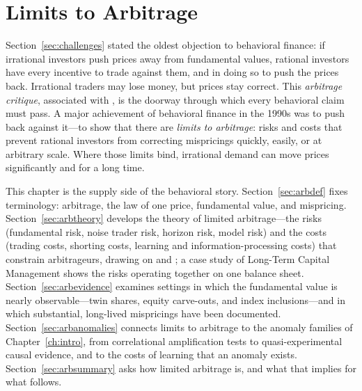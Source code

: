 \chapter{Limits to Arbitrage}
\label{ch:limits}

Section~\ref{sec:challenges} stated the oldest objection to behavioral finance: if irrational investors push prices away from fundamental values, rational investors have every incentive to trade against them, and in doing so to push the prices back. Irrational traders may lose money, but prices stay correct. This \emph{arbitrage critique}, associated with \citet{friedman1953}, is the doorway through which every behavioral claim must pass. A major achievement of behavioral finance in the 1990s was to push back against it---to show that there are \emph{limits to arbitrage}: risks and costs that prevent rational investors from correcting mispricings quickly, easily, or at arbitrary scale. Where those limits bind, irrational demand can move prices significantly and for a long time.

This chapter is the supply side of the behavioral story. Section~\ref{sec:arbdef} fixes terminology: arbitrage, the law of one price, fundamental value, and mispricing. Section~\ref{sec:arbtheory} develops the theory of limited arbitrage---the risks (fundamental risk, noise trader risk, horizon risk, model risk) and the costs (trading costs, shorting costs, learning and information-processing costs) that constrain arbitrageurs, drawing on \citet{delong1990} and \citet{shleifer1997}; a case study of Long-Term Capital Management shows the risks operating together on one balance sheet. Section~\ref{sec:arbevidence} examines settings in which the fundamental value is nearly observable---twin shares, equity carve-outs, and index inclusions---and in which substantial, long-lived mispricings have been documented. Section~\ref{sec:arbanomalies} connects limits to arbitrage to the anomaly families of Chapter~\ref{ch:intro}, from correlational amplification tests to quasi-experimental causal evidence, and to the costs of learning that an anomaly exists. Section~\ref{sec:arbsummary} asks how limited arbitrage is, and what that implies for what follows.

